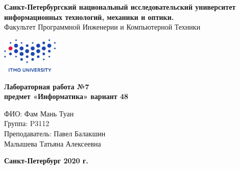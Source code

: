 \begin{center}
\textbf{Санкт-Петербургский национальный исследовательский университет информационных технологий, механики и оптики.}\\
Факультет Программной Инженерии и Компьютерной Техники

\vspace{4cm}
\includegraphics[width = 0.2\textwidth]{logo}
\vspace{4cm}
\begin {LARGE}
\textbf{Лабораторная работа №7\\ 
предмет «Информатика» вариант 48}
\end {LARGE}
\vspace{2cm}
\end{center}

\begin{flushleft}
\hspace{6cm}ФИО: Фам Мань Туан\\
\hspace{6cm}Группа: P3112 \\
\hspace{6cm}Преподаватель: Павел Балакшин\\
\hspace{9cm}Малышева Татьяна Алексеевна\\
\end{flushleft}
\vspace{8cm}

\begin{center}
\textbf{Санкт-Петербург 2020 г.}
\end{center}